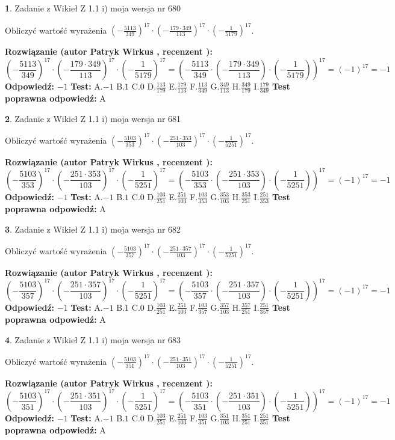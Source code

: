\documentclass[12pt, a4paper]{article}
\theoremstyle{definition} %
\newtheorem{zad}{}
\newcommand{\zadStart}[1]{\begin{zad}#1\newline}
\newcommand{\zadStop}{\end{zad}}
\newcommand{\rozwStart}[2]{\noindent \textbf{Rozwiązanie (autor #1 , recenzent #2): }\newline}
\newcommand{\rozwStop}{\newline}
\newcommand{\odpStart}{\noindent \textbf{Odpowiedź:}\newline}
\newcommand{\odpStop}{\newline}
\newcommand{\testStart}{\noindent \textbf{Test:}\newline}
\newcommand{\testStop}{\newline}
\newcommand{\kluczStart}{\noindent \textbf{Test poprawna odpowiedź:}\newline}
\newcommand{\kluczStop}{\newline}
\begin{document}
\zadStart{Zadanie z Wikieł Z 1.1 i) moja wersja nr 680}

Obliczyć wartość wyrażenia $(-\frac{5113}{349})^{17} \cdot (-\frac{179 \cdot 349}{113})^{17} \cdot (-\frac{1}{5179})^{17}$.
\zadStop
\rozwStart{Patryk Wirkus}{}
$$(-\frac{5113}{349})^{17} \cdot (-\frac{179 \cdot 349}{113})^{17} \cdot (-\frac{1}{5179})^{17} = (-\frac{5113}{349} \cdot (-\frac{179 \cdot 349}{113}) \cdot (-\frac{1}{5179}))^{17} = (-1)^{17} = -1$$
\rozwStop
\odpStart
$-1$
\odpStop
\testStart
A.$-1$ B.$1$ C.$0$ D.$\frac{113}{179}$ E.$\frac{179}{113}$
F.$\frac{113}{349}$ G.$\frac{349}{113}$
H.$\frac{349}{179}$
I.$\frac{179}{349}$
\testStop
\kluczStart
A
\kluczStop



\zadStart{Zadanie z Wikieł Z 1.1 i) moja wersja nr 681}

Obliczyć wartość wyrażenia $(-\frac{5103}{353})^{17} \cdot (-\frac{251 \cdot 353}{103})^{17} \cdot (-\frac{1}{5251})^{17}$.
\zadStop
\rozwStart{Patryk Wirkus}{}
$$(-\frac{5103}{353})^{17} \cdot (-\frac{251 \cdot 353}{103})^{17} \cdot (-\frac{1}{5251})^{17} = (-\frac{5103}{353} \cdot (-\frac{251 \cdot 353}{103}) \cdot (-\frac{1}{5251}))^{17} = (-1)^{17} = -1$$
\rozwStop
\odpStart
$-1$
\odpStop
\testStart
A.$-1$ B.$1$ C.$0$ D.$\frac{103}{251}$ E.$\frac{251}{103}$
F.$\frac{103}{353}$ G.$\frac{353}{103}$
H.$\frac{353}{251}$
I.$\frac{251}{353}$
\testStop
\kluczStart
A
\kluczStop



\zadStart{Zadanie z Wikieł Z 1.1 i) moja wersja nr 682}

Obliczyć wartość wyrażenia $(-\frac{5103}{357})^{17} \cdot (-\frac{251 \cdot 357}{103})^{17} \cdot (-\frac{1}{5251})^{17}$.
\zadStop
\rozwStart{Patryk Wirkus}{}
$$(-\frac{5103}{357})^{17} \cdot (-\frac{251 \cdot 357}{103})^{17} \cdot (-\frac{1}{5251})^{17} = (-\frac{5103}{357} \cdot (-\frac{251 \cdot 357}{103}) \cdot (-\frac{1}{5251}))^{17} = (-1)^{17} = -1$$
\rozwStop
\odpStart
$-1$
\odpStop
\testStart
A.$-1$ B.$1$ C.$0$ D.$\frac{103}{251}$ E.$\frac{251}{103}$
F.$\frac{103}{357}$ G.$\frac{357}{103}$
H.$\frac{357}{251}$
I.$\frac{251}{357}$
\testStop
\kluczStart
A
\kluczStop



\zadStart{Zadanie z Wikieł Z 1.1 i) moja wersja nr 683}

Obliczyć wartość wyrażenia $(-\frac{5103}{351})^{17} \cdot (-\frac{251 \cdot 351}{103})^{17} \cdot (-\frac{1}{5251})^{17}$.
\zadStop
\rozwStart{Patryk Wirkus}{}
$$(-\frac{5103}{351})^{17} \cdot (-\frac{251 \cdot 351}{103})^{17} \cdot (-\frac{1}{5251})^{17} = (-\frac{5103}{351} \cdot (-\frac{251 \cdot 351}{103}) \cdot (-\frac{1}{5251}))^{17} = (-1)^{17} = -1$$
\rozwStop
\odpStart
$-1$
\odpStop
\testStart
A.$-1$ B.$1$ C.$0$ D.$\frac{103}{251}$ E.$\frac{251}{103}$
F.$\frac{103}{351}$ G.$\frac{351}{103}$
H.$\frac{351}{251}$
I.$\frac{251}{351}$
\testStop
\kluczStart
A
\kluczStop
\end{document}

